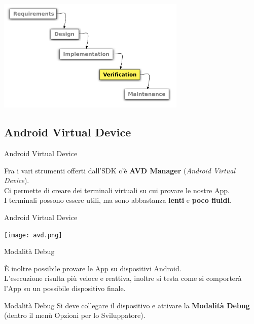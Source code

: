 \documentclass[xcolor=svgnames,11pt]{beamer}
\begin{document}
\begin{frame}
\begin{center}
\includegraphics[width=9cm]{waterfall_4.pdf}
\end{center}
\end{frame}

\subsection{Android Virtual Device}
\begin{frame}{Android Virtual Device}

	Fra i vari strumenti offerti dall'SDK c'\`e \textbf{AVD Manager} (\emph{Android Virtual Device}).\\
	\pause
	\medskip
	Ci permette di creare dei terminali virtuali su cui provare le nostre App.\\
	\pause
	\medskip
	I terminali possono essere utili, ma sono abbastanza \textbf{lenti} e \textbf{poco fluidi}.

\end{frame}
\begin{frame}{Android Virtual Device}

\begin{center}
\texttt{[image: avd.png]}
\end{center}
\end{frame}

\begin{frame}{Modalit\`a Debug}

	\`E inoltre possibile provare le App su dispositivi Android.\\
	\pause
	\medskip
	L'esecuzione risulta pi\`u veloce e reattiva, inoltre si testa come si comporter\`a l'App su un possibile dispositivo finale.\\
	\pause
	\medskip
	\begin{block}{Modalit\`a Debug}
	Si deve collegare il dispositivo e attivare la \textbf{Modalit\`a Debug} (dentro il men\`u Opzioni per lo Sviluppatore).
	\end{block}	
\end{frame}
\end{document}
